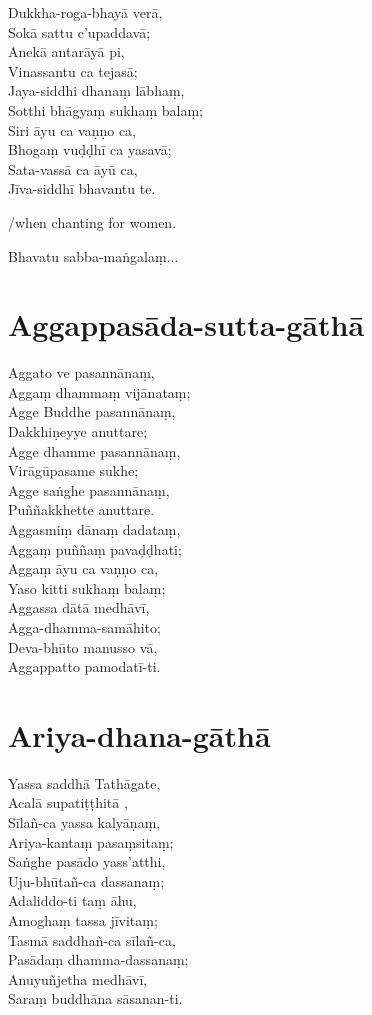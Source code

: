 Dukkha-roga-bhayā verā,\\
Sokā sattu c'upaddavā;\\
Anekā antarāyā pi,\\
Vinassantu ca tejasā;\\
Jaya-siddhi dhanaṃ lābhaṃ,\\
Sotthi bhāgyaṃ sukhaṃ balaṃ;\\
Siri āyu ca vaṇṇo ca,\\
Bhogaṃ vuḍḍhī ca yasavā;\\
Sata-vassā ca āyū ca,\\
Jīva-siddhī bhavantu te.

/when chanting for women.

Bhavatu sabba-maṅgalaṃ...

\chapter{Aggappasāda-sutta-gāthā}

Aggato ve pasannānaṃ,\\
Aggaṃ dhammaṃ vijānataṃ;\\
Agge Buddhe pasannānaṃ,\\
Dakkhiṇeyye anuttare;\\
Agge dhamme pasannānaṃ,\\
Virāgūpasame sukhe;\\
Agge saṅghe pasannānaṃ,\\
Puññakkhette anuttare.\\
Aggasmiṃ dānaṃ dadataṃ,\\
Aggaṃ puññaṃ pavaḍḍhati;\\
Aggaṃ āyu ca vaṇṇo ca,\\
Yaso kitti sukhaṃ balaṃ;\\
Aggassa dātā medhāvī,\\
Agga-dhamma-samāhito;\\
Deva-bhūto manusso vā,\\
Aggappatto pamodatī-ti.

\chapter{Ariya-dhana-gāthā}

Yassa saddhā Tathāgate,\\
Acalā supatiṭṭhitā ,\\
Sīlañ-ca yassa kalyāṇaṃ,\\
Ariya-kantaṃ pasaṃsitaṃ;\\
Saṅghe pasādo yass'atthi,\\
Uju-bhūtañ-ca dassanaṃ;\\
Adaliddo-ti taṃ āhu,\\
Amoghaṃ tassa jīvitaṃ;\\
Tasmā saddhañ-ca sīlañ-ca,\\
Pasādaṃ dhamma-dassanaṃ;\\
Anuyuñjetha medhāvī,\\
Saraṃ buddhāna sāsanan-ti.

